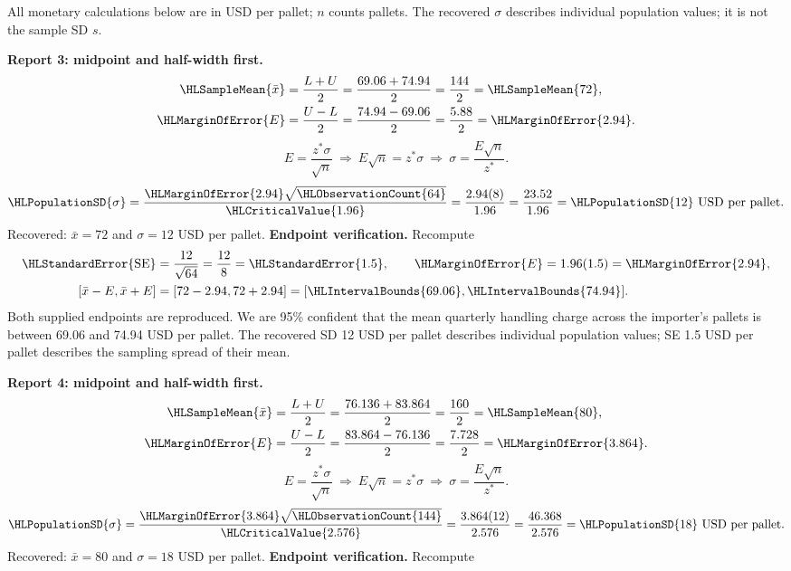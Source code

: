 All monetary calculations below are in USD per pallet; $n$ counts pallets. The recovered $\sigma$ describes individual population values; it is not the sample SD $s$.
\par\noindent\textbf{Report 3: midpoint and half-width first.}
\[\begin{aligned}
\HLSampleMean{\bar x}&=\frac{L+U}{2}=\frac{69.06+74.94}{2}=\frac{144}{2}=\HLSampleMean{72},\\
\HLMarginOfError{E}&=\frac{U-L}{2}=\frac{74.94-69.06}{2}=\frac{5.88}{2}=\HLMarginOfError{2.94}.
\end{aligned}\]
\[E=\frac{z^*\sigma}{\sqrt n}\ \Longrightarrow\ E\sqrt n=z^*\sigma\ \Longrightarrow\ \sigma=\frac{E\sqrt n}{z^*}.\]
\[\HLPopulationSD{\sigma}=\frac{\HLMarginOfError{2.94}\sqrt{\HLObservationCount{64}}}{\HLCriticalValue{1.96}}=\frac{2.94(8)}{1.96}=\frac{23.52}{1.96}=\HLPopulationSD{12}\text{ USD per pallet}.\]
Recovered: $\bar x=72$ and $\sigma=12$ USD per pallet.
\textbf{Endpoint verification.} Recompute
\[\begin{aligned}
\HLStandardError{\mathrm{SE}}&=\frac{12}{\sqrt{64}}=\frac{12}{8}=\HLStandardError{1.5},\qquad \HLMarginOfError{E}=1.96(1.5)=\HLMarginOfError{2.94},\\
[\bar x-E,\bar x+E]&=[72-2.94,72+2.94]=[\HLIntervalBounds{69.06},\HLIntervalBounds{74.94}].
\end{aligned}\]
Both supplied endpoints are reproduced. We are 95\% confident that the mean quarterly handling charge across the importer's pallets is between 69.06 and 74.94 USD per pallet.
The recovered SD 12 USD per pallet describes individual population values; SE 1.5 USD per pallet describes the sampling spread of their mean.
\par\noindent\textbf{Report 4: midpoint and half-width first.}
\[\begin{aligned}
\HLSampleMean{\bar x}&=\frac{L+U}{2}=\frac{76.136+83.864}{2}=\frac{160}{2}=\HLSampleMean{80},\\
\HLMarginOfError{E}&=\frac{U-L}{2}=\frac{83.864-76.136}{2}=\frac{7.728}{2}=\HLMarginOfError{3.864}.
\end{aligned}\]
\[E=\frac{z^*\sigma}{\sqrt n}\ \Longrightarrow\ E\sqrt n=z^*\sigma\ \Longrightarrow\ \sigma=\frac{E\sqrt n}{z^*}.\]
\[\HLPopulationSD{\sigma}=\frac{\HLMarginOfError{3.864}\sqrt{\HLObservationCount{144}}}{\HLCriticalValue{2.576}}=\frac{3.864(12)}{2.576}=\frac{46.368}{2.576}=\HLPopulationSD{18}\text{ USD per pallet}.\]
Recovered: $\bar x=80$ and $\sigma=18$ USD per pallet.
\textbf{Endpoint verification.} Recompute
